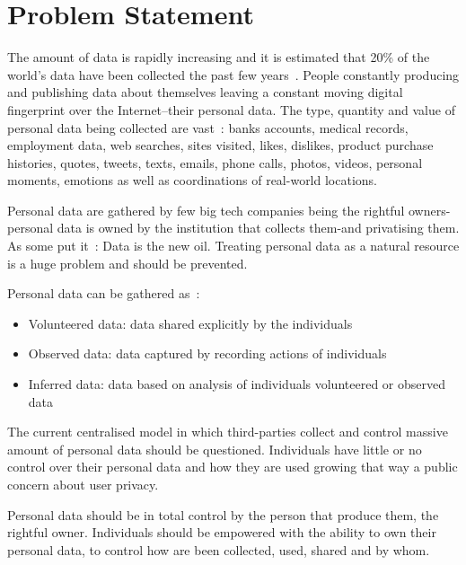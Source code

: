 \chapter{Problem Statement}
\label{problem}

The amount of data is rapidly increasing and it is estimated that 20\% of the world's data have been collected the past
few years~\cite{10.1109/SPW.2015.27,big_data_better_worse}. People constantly producing and publishing data about themselves
leaving a constant moving digital fingerprint over the Internet--their personal data. The type, quantity and value of personal data
being collected are vast~\cite{emergence_new_assets_wef}: banks accounts, medical records, employment data, web searches, sites visited,
likes, dislikes, product purchase histories, quotes, tweets, texts, emails, phone calls, photos, videos, personal moments, emotions
as well as coordinations of real-world locations.

Personal data are gathered by few big tech companies being the rightful owners-personal data is owned by the institution that collects them-and privatising them.
As some put it~\cite{data_new_oil_01,data_new_oil_02,data_new_oil_03,data_new_oil_04,data_new_oil_05,data_new_oil_05,data_new_oil_06,data_new_oil_07,data_new_oil_08,data_new_oil_09}: Data is the new oil. Treating personal data as a natural resource is a huge problem and should be prevented. 

Personal data can be gathered as~\cite{emergence_new_assets_wef}:
\begin{itemize}
  \item Volunteered data: data shared explicitly by the individuals
  \item Observed data: data captured by recording actions of individuals
  \item Inferred data: data based on analysis of individuals volunteered or observed data
\end{itemize}

The current centralised model in which third-parties collect and control massive amount of personal data should be questioned.
Individuals have little or no control over their personal data and how they are used growing that way a public concern about
user privacy.

Personal data should be in total control by the person that produce them, the rightful owner. Individuals should be empowered
with the ability to own their personal data, to control how are been collected, used, shared and by whom.

